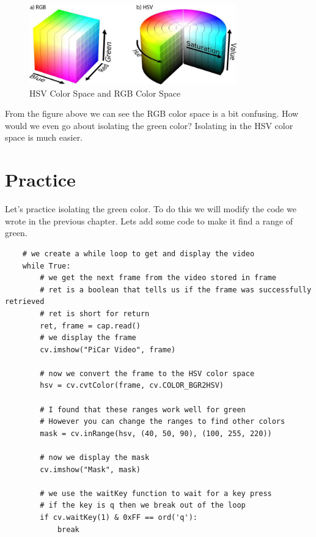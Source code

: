 \documentclass[11pt]{report}
\begin{document}
\begin{figure}[htbp]
    \centering
    \includegraphics[width=0.8\textwidth]{HSVVSRGB.jpeg}
    \caption{HSV Color Space and RGB Color Space}
    \label{fig:HSVVSRGB}
\end{figure}

From the figure above we can see the RGB color space is a bit confusing. How would we even go about isolating the green color? Isolating in the HSV color space is much easier.

\section{Practice}
Let's practice isolating the green color. To do this we will modify the code we wrote in the previous chapter. Lets add some code to make it find a range of green.

\begin{verbatim}
    # we create a while loop to get and display the video
    while True:
        # we get the next frame from the video stored in frame
        # ret is a boolean that tells us if the frame was successfully retrieved
        # ret is short for return
        ret, frame = cap.read()
        # we display the frame
        cv.imshow("PiCar Video", frame)

        # now we convert the frame to the HSV color space
        hsv = cv.cvtColor(frame, cv.COLOR_BGR2HSV)

        # I found that these ranges work well for green
        # However you can change the ranges to find other colors
        mask = cv.inRange(hsv, (40, 50, 90), (100, 255, 220))

        # now we display the mask
        cv.imshow("Mask", mask)

        # we use the waitKey function to wait for a key press
        # if the key is q then we break out of the loop
        if cv.waitKey(1) & 0xFF == ord('q'):
            break

\end{verbatim}
\end{document}
